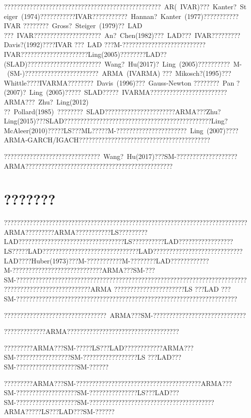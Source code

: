 \documentclass[a4paper,12pt,openany,oneside,utf-8]{ctexbook}
\begin{document}
	?????????????????????????????????????????????????~AR(~IVAR)???~Kanter?~Steiger~(1974)???????????IVAR???????????~Hannan?~Kanter~(1977)???????????IVAR ????????~Gross?~Steiger~(1979)??~LAD ???~IVAR?????????????????????~An?~Chen(1982)???~LAD???~IVAR?????????~Davis?(1992)????IVAR ???~LAD ???M-??????????????????????????IVAR?????????????????????Ling(2005)????????LAD??(SLAD)???????????????????????~Wang?~Hu(2017)?~Ling~(2005)??????????~M-~(SM-)???????????????????????~ARMA~(IVARMA) ???~Mikosch?(1995)???Whittle????IVARMA????????~Davis~(1996)???~Gauss-Newton ????????~Pan ?(2007)?~Ling~(2005)?????~SLAD?????~IVARMA????????????????????????ARMA???~Zhu?~Ling(2012) ??~Pollard(1985)~????????~SLAD??????????????????????ARMA???Zhu?Ling(2015)???SLAD??????????????????????????????????????????????Ling?McAleer(2010)?????LS???ML?????M-??????????????????????~Ling~(2007)????ARMA-GARCH/IGACH?????????????????????????????????????????
	
	??????????????????????????????~Wang?~Hu(2017)???SM-???????????????????ARMA??????????????????????????????????????????????
	
	\section{???????}
	
	????????????????????????????????????????????????????????????????????????????ARMA?????????ARMA???????????LS?????????LAD?????????????????????????????????LS??????????LAD?????????????????LS?????LAD??????????????????????????????LAD????????????????????????????LAD????Huber(1973)???M-???????????M-????????LAD????????????M-????????????????????????????ARMA???SM-???SM-???????????????????????????????????????????????????????????????????????????????????????????????????ARMA ??????????????????????LS ???LAD ???SM-?????????????????????????????????????????????????????????????????????
	
	????????????????????????????????~ARMA???SM-?????????????????????????????
	
	?????????????ARMA???????????????????????????????????
	
	?????????ARMA???SM-?????LS???LAD????????????ARMA???SM-?????????????????SM-?????????????????LS ???LAD???SM-???????????????????SM-??????
	
	?????????ARMA???SM-???????????????????????????????????????ARMA???SM-???????????????????SM-???????????????LS???LAD???SM-???????????????????SM-???????????????????????????????????????ARMA?????LS???LAD???SM-??????
	
\end{document}
